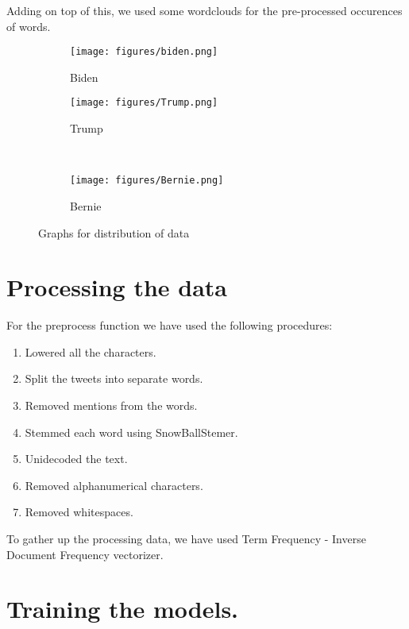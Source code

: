 \documentclass[11pt, a4paper]{article}
\begin{document}
\begin{large}
Adding on top of this, we used some wordclouds for the pre-processed occurences of words.


\begin{figure}
  \begin{subfigure}{.5\textwidth}
    \centering
    \texttt{[image: figures/biden.png]}
    \caption{Biden}
    \label{fig:sub1}
  \end{subfigure}%
  \begin{subfigure}{.5\textwidth}
    \centering
    \texttt{[image: figures/Trump.png]}
    \caption{Trump}
    \label{fig:sub2}
  \end{subfigure}\\\phantom{aaaaaaaaaaaaaaaaa}
  \begin{subfigure}{.5\textwidth}
    \centering
    \texttt{[image: figures/Bernie.png]}
    \caption{Bernie}
    \label{fig:sub2}
  \end{subfigure}
  \caption{Graphs for distribution of data}
  \label{fig:test}
\end{figure}






\section{Processing the data}

For the preprocess function we have used the following procedures:

\begin{enumerate}
    \item Lowered all the characters.
    \item Split the tweets into separate words.
    \item Removed mentions from the words.
    \item Stemmed each word using SnowBallStemer.
    \item Unidecoded the text.
    \item Removed alphanumerical characters.
    \item Removed whitespaces.
\end{enumerate}

To gather up the processing data, we have used Term Frequency - Inverse Document Frequency vectorizer.



\section{Training the models.}


\end{large}
\end{document}
